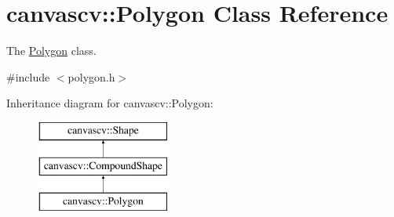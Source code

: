 \hypertarget{classcanvascv_1_1Polygon}{}\section{canvascv\+:\+:Polygon Class Reference}
\label{classcanvascv_1_1Polygon}


The \hyperlink{classcanvascv_1_1Polygon}{Polygon} class.  




{\ttfamily \#include $<$polygon.\+h$>$}

Inheritance diagram for canvascv\+:\+:Polygon\+:\begin{figure}[H]
\begin{center}
\leavevmode
\includegraphics[height=3.000000cm]{classcanvascv_1_1Polygon}
\end{center}
\end{figure}

